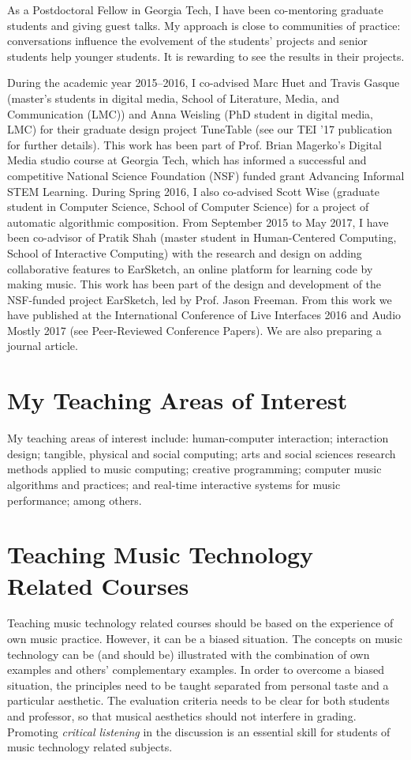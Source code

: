 \documentclass[10pt, a4paper]{article}
\begin{document}
As a Postdoctoral Fellow in Georgia Tech, I have been co-mentoring graduate students and giving guest talks. My approach is close to communities of practice: conversations influence the evolvement of the students' projects and senior students help younger students. It is rewarding to see the results in their projects.

During the academic year 2015--2016, I co-advised Marc Huet and Travis Gasque (master's students in digital media, School of Literature, Media, and Communication (LMC)) and Anna Weisling (PhD student in digital media, LMC) for their graduate design project TuneTable (see our TEI '17 publication for further details). This work has been part of Prof. Brian Magerko’s Digital Media studio course at Georgia Tech, which has informed a successful and competitive National Science Foundation (NSF) funded grant Advancing Informal STEM Learning. During Spring 2016, I also co-advised Scott Wise (graduate student in Computer Science, School of Computer Science) for a project of automatic algorithmic composition. From September 2015 to May 2017, I have been co-advisor of Pratik Shah (master student in Human-Centered Computing, School of Interactive Computing) with the research and design on adding collaborative features to EarSketch, an online platform for learning code by making music. This work has been part of the design and development of the NSF-funded project EarSketch, led by Prof. Jason Freeman. From this work we have published at the International Conference of Live Interfaces 2016 and Audio Mostly 2017 (see Peer-Reviewed Conference Papers). We are also preparing a journal article.

\section*{My Teaching Areas of Interest}

My teaching areas of interest include: human-computer interaction; interaction design; tangible, physical and social computing; arts and social sciences research methods applied to music computing; creative programming; computer music algorithms and practices; and real-time interactive systems for music performance; among others. 

\section*{Teaching Music Technology Related Courses}

Teaching music technology related courses should be based on the experience of own music practice. However, it can be a biased situation. The concepts on music technology can be (and should be) illustrated with the combination of own examples and others' complementary examples. In order to overcome a biased situation, the principles need to be taught separated from  personal taste and a particular aesthetic. The evaluation criteria needs to be clear for both students and professor, so that musical aesthetics should not interfere in grading. Promoting \emph{critical listening} in the discussion is an essential skill for students of music technology related subjects. 
\end{document}
